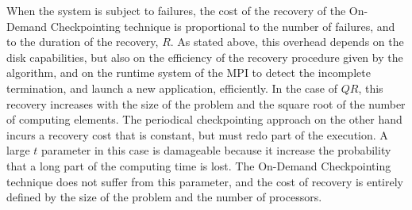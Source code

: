 \begin{comment}
Both models present a linear progression with the number of
faults. When $n=0$, the On-Demand Checkpointing approach slowdown
is the factor $\alpha$, while the slowdown in the periodical Checkpointing 
approach is proportional to $(c+t)/t = 1+c/t$. As was
demonstrated in~\cite{lawn253}, $alpha$ decreases when the number of
processes increase. In the case of the QR factorization, it increases
with the square root of the problem size, to maintain the checksum
operation. $c/t$ is proportional to the duration of the checkpoint
operation, hence to the problem size, and in non-scalable storage
system with the number of processes. Moreover, it is highly dependent
on the $t$ parameter, that is often set conservatively to guarantee
progress in case of failures.
\end{comment}

When the system is subject to failures, the cost of the recovery of the
On-Demand Checkpointing technique is proportional to the number of failures, and
to the duration of the recovery, $R$. As stated above, this overhead depends on
the disk capabilities, but also on the efficiency of the recovery procedure
given by the \abft algorithm, and on the runtime system of the MPI to detect the
incomplete termination, and launch a new application, efficiently. In the case
of $QR$, this recovery increases with the size of the problem and the square
root of the number of computing elements. The periodical checkpointing approach
on the other hand incurs a recovery cost that is constant, but must redo part of
the execution. A large $t$ parameter in this case is damageable because it
increase the probability that a long part of the computing time is lost. The
On-Demand Checkpointing technique does not suffer from this parameter, and the
cost of recovery is entirely defined by the size of the problem and the number
of processors.
